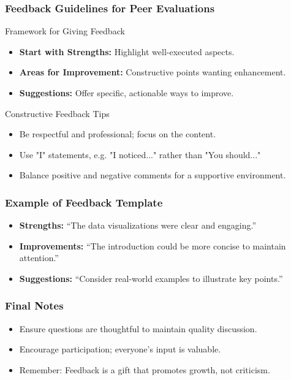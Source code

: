 \documentclass{beamer}
\begin{document}
\begin{frame}[fragile]
    \frametitle{Feedback Guidelines for Peer Evaluations}
    \begin{block}{Framework for Giving Feedback}
        \begin{itemize}
            \item \textbf{Start with Strengths:} Highlight well-executed aspects.
            \item \textbf{Areas for Improvement:} Constructive points wanting enhancement.
            \item \textbf{Suggestions:} Offer specific, actionable ways to improve.
        \end{itemize}
    \end{block}

    \begin{block}{Constructive Feedback Tips}
        \begin{itemize}
            \item Be respectful and professional; focus on the content.
            \item Use "I" statements, e.g. "I noticed..." rather than "You should..."
            \item Balance positive and negative comments for a supportive environment.
        \end{itemize}
    \end{block}
\end{frame}

\begin{frame}[fragile]
    \frametitle{Example of Feedback Template}
    \begin{itemize}
        \item \textbf{Strengths:} “The data visualizations were clear and engaging.”
        \item \textbf{Improvements:} “The introduction could be more concise to maintain attention.”
        \item \textbf{Suggestions:} “Consider real-world examples to illustrate key points.”
    \end{itemize}
\end{frame}

\begin{frame}[fragile]
    \frametitle{Final Notes}
    \begin{itemize}
        \item Ensure questions are thoughtful to maintain quality discussion.
        \item Encourage participation; everyone's input is valuable.
        \item Remember: Feedback is a gift that promotes growth, not criticism.
    \end{itemize}
\end{frame}
\end{document}
